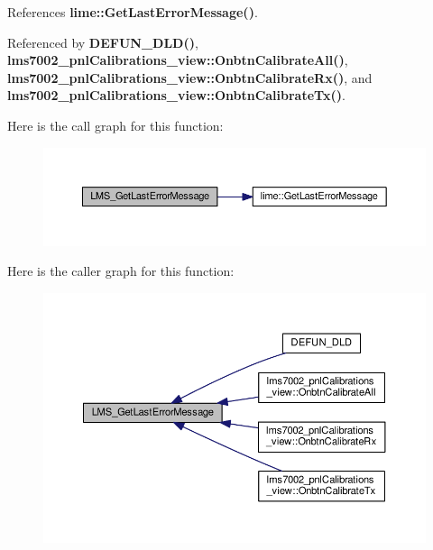 References {\bf lime\+::\+Get\+Last\+Error\+Message()}.



Referenced by {\bf D\+E\+F\+U\+N\+\_\+\+D\+L\+D()}, {\bf lms7002\+\_\+pnl\+Calibrations\+\_\+view\+::\+Onbtn\+Calibrate\+All()}, {\bf lms7002\+\_\+pnl\+Calibrations\+\_\+view\+::\+Onbtn\+Calibrate\+Rx()}, and {\bf lms7002\+\_\+pnl\+Calibrations\+\_\+view\+::\+Onbtn\+Calibrate\+Tx()}.



Here is the call graph for this function\+:
\nopagebreak
\begin{figure}[H]
\begin{center}
\leavevmode
\includegraphics[width=350pt]{df/de1/lms7__api_8cpp_a50e22f8ed4b6a628841c5f8b4a0be215_cgraph}
\end{center}
\end{figure}




Here is the caller graph for this function\+:
\nopagebreak
\begin{figure}[H]
\begin{center}
\leavevmode
\includegraphics[width=350pt]{df/de1/lms7__api_8cpp_a50e22f8ed4b6a628841c5f8b4a0be215_icgraph}
\end{center}
\end{figure}


